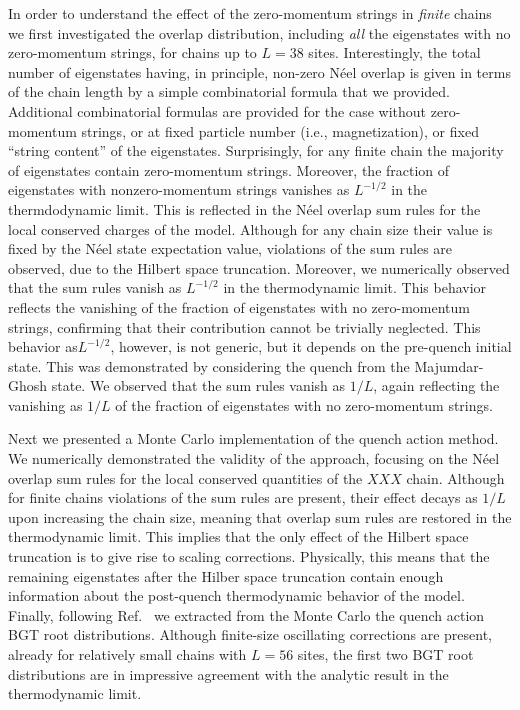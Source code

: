 \documentclass[11pt]{iopart}
\begin{document}
In order to understand the effect of the zero-momentum strings in {\it finite} chains 
we first investigated the overlap distribution, including {\it all} the eigenstates 
with no zero-momentum strings, for chains up to $L=38$ sites. Interestingly, the total 
number of eigenstates having, in principle, non-zero N\'eel overlap is given in terms of 
the chain length by a simple combinatorial formula that we provided. Additional 
combinatorial formulas are provided for the case without zero-momentum strings, or 
at fixed particle number (i.e., magnetization), or fixed ``string content'' of the 
eigenstates. Surprisingly, for any finite chain the majority of eigenstates contain 
zero-momentum strings. Moreover, the fraction of eigenstates with nonzero-momentum 
strings vanishes as $L^{-1/2}$ in the thermdodynamic limit. This is reflected in the 
N\'eel overlap sum rules for the local conserved charges of the model. 
Although for any chain size their value is fixed by the N\'eel state expectation 
value, violations of the sum rules are observed, due to the Hilbert space truncation. 
Moreover, we numerically observed that the sum rules vanish as $L^{-1/2}$ in the 
thermodynamic limit. This behavior reflects the vanishing of the fraction of 
eigenstates with no zero-momentum strings, confirming that their contribution 
cannot be trivially neglected. This behavior as$L^{-1/2}$, however, is not generic, 
but it depends on the pre-quench initial state. This was demonstrated by 
considering the quench from the Majumdar-Ghosh state. We observed that the sum 
rules vanish as $1/L$, again reflecting the vanishing as $1/L$ of the fraction of 
eigenstates with no zero-momentum strings. 

Next we presented a Monte Carlo implementation of the quench action method. 
We numerically demonstrated the validity of the approach, focusing on the N\'eel 
overlap sum rules for the local conserved quantities of the $XXX$ chain. Although 
for finite chains violations of the sum rules are present, their effect decays 
as $1/L$ upon increasing the chain size, meaning that overlap sum rules are 
restored in the thermodynamic limit. This implies that the only effect of the 
Hilbert space truncation is to give rise to scaling corrections. Physically, 
this means that the remaining eigenstates after the Hilber space truncation 
contain enough information about the post-quench thermodynamic behavior of the 
model. Finally, following Ref.~\cite{alba-2015} we extracted from the Monte Carlo 
the quench action BGT root distributions. Although finite-size oscillating 
corrections are present, already for relatively small chains with $L=56$ sites, 
the first two BGT root distributions are in impressive agreement with the 
analytic result in the thermodynamic limit. 
\end{document}
